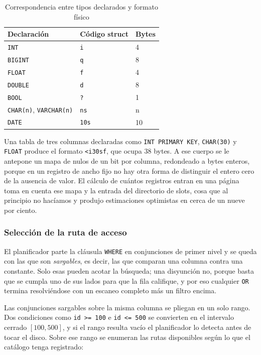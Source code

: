 \documentclass[a4paper,12pt]{article}
\begin{document}
\begin{table}[H]
\centering
\caption{Correspondencia entre tipos declarados y formato físico}
\begin{tabular}{@{}lll@{}}
\toprule
\textbf{Declaración} & \textbf{Código struct} & \textbf{Bytes} \\
\midrule
\texttt{INT} & \texttt{i} & 4 \\
\texttt{BIGINT} & \texttt{q} & 8 \\
\texttt{FLOAT} & \texttt{f} & 4 \\
\texttt{DOUBLE} & \texttt{d} & 8 \\
\texttt{BOOL} & \texttt{?} & 1 \\
\texttt{CHAR(n)}, \texttt{VARCHAR(n)} & \texttt{ns} & n \\
\texttt{DATE} & \texttt{10s} & 10 \\
\bottomrule
\end{tabular}
\end{table}

Una tabla de tres columnas declaradas como \texttt{INT PRIMARY KEY},
\texttt{CHAR(30)} y \texttt{FLOAT} produce el formato \texttt{<i30sf}, que
ocupa 38 bytes. A ese cuerpo se
le antepone un mapa de nulos de un bit por columna, redondeado a bytes enteros,
porque en un registro de ancho fijo no hay otra forma de distinguir el entero
cero de la ausencia de valor. El cálculo de cuántos registros entran en una
página toma en cuenta ese mapa y la entrada del directorio de slots, cosa que al
principio no hacíamos y produjo estimaciones optimistas en cerca de un nueve
por ciento.

\subsubsection{Selección de la ruta de acceso}

El planificador parte la cláusula \texttt{WHERE} en conjunciones de primer
nivel y se queda con las que son \textit{sargables}, es decir, las que comparan
una columna contra una constante. Solo esas pueden acotar la búsqueda; una
disyunción no, porque basta que se cumpla uno de sus lados para que la fila
califique, y por eso cualquier \texttt{OR} termina resolviéndose con un escaneo
completo más un filtro encima.

Las conjunciones sargables sobre la misma columna se pliegan en un solo rango.
Dos condiciones como \texttt{id >= 100} e \texttt{id <= 500} se convierten en el
intervalo cerrado $[100, 500]$, y si el rango resulta vacío el planificador lo
detecta antes de tocar el disco. Sobre ese rango se enumeran las rutas
disponibles según lo que el catálogo tenga registrado:
\end{document}
